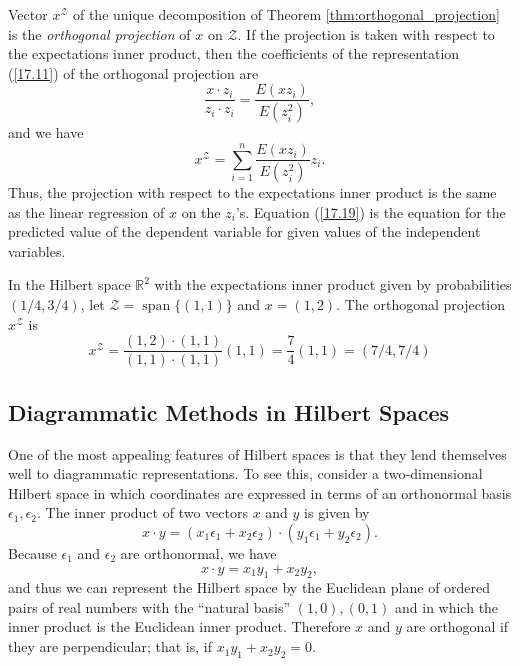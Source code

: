 \documentclass[\topdir/lecture\_notes.tex]{subfiles}
\begin{document}
Vector \(x^{\mathcal{Z}}\) of the unique decomposition of Theorem \ref{thm:orthogonal_projection} is the \emph{orthogonal projection} of \(x\) on \(\mathcal{Z}\). If the projection is taken with respect to the expectations inner product, then the coefficients of the representation (\ref{17.11}) of the orthogonal projection are
\begin{equation*}
\frac{x \cdot z_{i}}{z_{i} \cdot z_{i}}=\frac{E(x z_{i})}{E(z_{i}^{2})}, 
\end{equation*}
and we have
\begin{equation}
x^{\mathcal{Z}}=\sum_{i=1}^{n} \frac{E(x z_{i})}{E(z_{i}^{2})} z_{i}. \label{17.19}
\end{equation}
Thus, the projection with respect to the expectations inner product is the same as the linear regression of \(x\) on the \(z_{i}\)'s. Equation (\ref{17.19}) is the equation for the predicted value of the dependent variable for given values of the independent variables.
\begin{example}\label{ex:hilbert_projection_example}
In the Hilbert space \(\mathbb{R}^{2}\) with the expectations inner product given by probabilities $(1/4, 3/4)$, let \(\mathcal{Z}=\operatorname{span}\{(1,1)\}\) and \(x=(1,2)\). The orthogonal projection \(x^{\mathcal{Z}}\) is
\begin{equation*}
x^{\mathcal{Z}}=\frac{(1,2) \cdot(1,1)}{(1,1) \cdot(1,1)}(1,1)=\frac{7}{4}(1,1)=(7/4, 7/4) 
\end{equation*}
\end{example}
\subsection{Diagrammatic Methods in Hilbert Spaces}
One of the most appealing features of Hilbert spaces is that they lend themselves well to diagrammatic representations. To see this, consider a two-dimensional Hilbert space in which coordinates are expressed in terms of an orthonormal basis \(\epsilon_{1}, \epsilon_{2}\). The inner product of two vectors \(x\) and \(y\) is given by
\begin{equation*}
x \cdot y=\left(x_{1} \epsilon_{1}+x_{2} \epsilon_{2}\right) \cdot\left(y_{1} \epsilon_{1}+y_{2} \epsilon_{2}\right). 
\end{equation*}
Because \(\epsilon_{1}\) and \(\epsilon_{2}\) are orthonormal, we have
\begin{equation*}
x \cdot y=x_{1} y_{1}+x_{2} y_{2}, 
\end{equation*}
and thus we can represent the Hilbert space by the Euclidean plane of ordered pairs of real numbers with the ``natural basis'' $(1,0),(0,1)$ and in which the inner product is the Euclidean inner product. Therefore \(x\) and \(y\) are orthogonal if they are perpendicular; that is, if \(x_{1} y_{1}+x_{2} y_{2}=0\).
\end{document}
